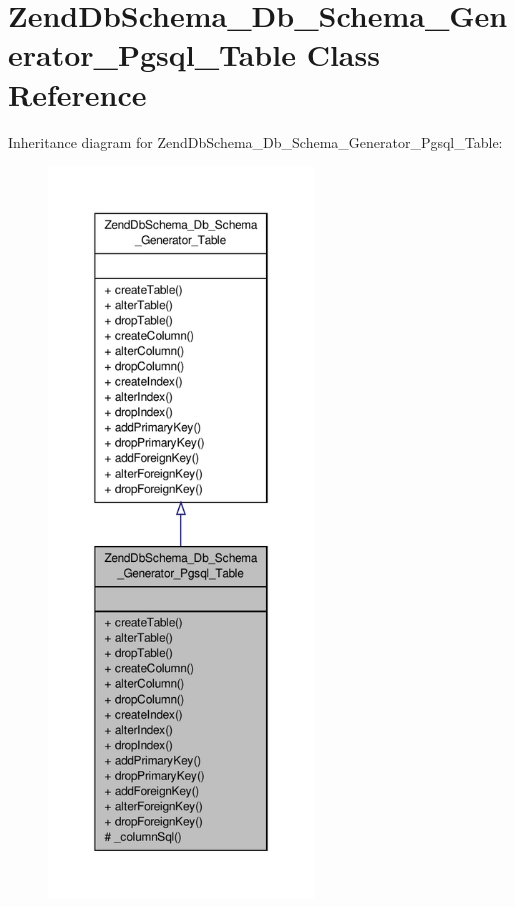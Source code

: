 \hypertarget{classZendDbSchema__Db__Schema__Generator__Pgsql__Table}{\section{Zend\-Db\-Schema\-\_\-\-Db\-\_\-\-Schema\-\_\-\-Generator\-\_\-\-Pgsql\-\_\-\-Table Class Reference}
\label{classZendDbSchema__Db__Schema__Generator__Pgsql__Table}
}


Inheritance diagram for Zend\-Db\-Schema\-\_\-\-Db\-\_\-\-Schema\-\_\-\-Generator\-\_\-\-Pgsql\-\_\-\-Table\-:\nopagebreak
\begin{figure}[H]
\begin{center}
\leavevmode
\includegraphics[height=550pt]{classZendDbSchema__Db__Schema__Generator__Pgsql__Table__inherit__graph}
\end{center}
\end{figure}


